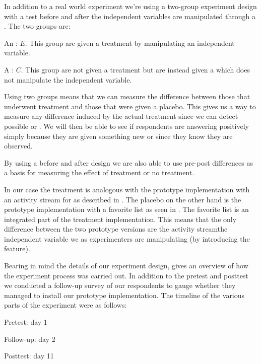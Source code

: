 In addition to a real world experiment we're using a two-group experiment
design with a test before and after the independent variables are
manipulated through a .
The two groups are:

\begin{items}
  \item An : $E$. This group are given a treatment by
    manipulating an independent variable.
  \item A : $C$. This group are not given a treatment but
    are instead given a  which does not manipulate the
    independent variable.
\end{items}

Using two groups means that we can measure the difference between those that
underwent treatment and those that were given a placebo. This gives us a way
to measure any difference induced by the actual treatment since we can detect
possible  or .
We will then be able to see if respondents are answering positively simply
because they are given something new or since they know they are
observed.

By using a before and after design we are also able to use pre-post
differences as a basis for measuring the effect of treatment or no
treatment.

In our case the treatment is analogous with the prototype implementation with
an activity stream for \urort{} as described in
.
The placebo on the other hand is the 
prototype implementation with a favorite list as seen in
.
The favorite list is an integrated part of the treatment implementation.
This means that the only difference between the two prototype versions are
the activity stream\dash{}the independent variable we as experimenters are
manipulating (by introducing the feature).

Bearing in mind the details of our experiment design,
 gives an overview of how the experiment
process was carried out. In addition to the pretest and posttest we
conducted a follow-up survey of our respondents to gauge whether they managed
to install our prototype implementation. The timeline of the various parts
of the experiment were as follows:

\begin{enum}
  \item Pretest: day 1
  \item Follow-up: day 2
  \item Posttest: day 11
\end{enum}


